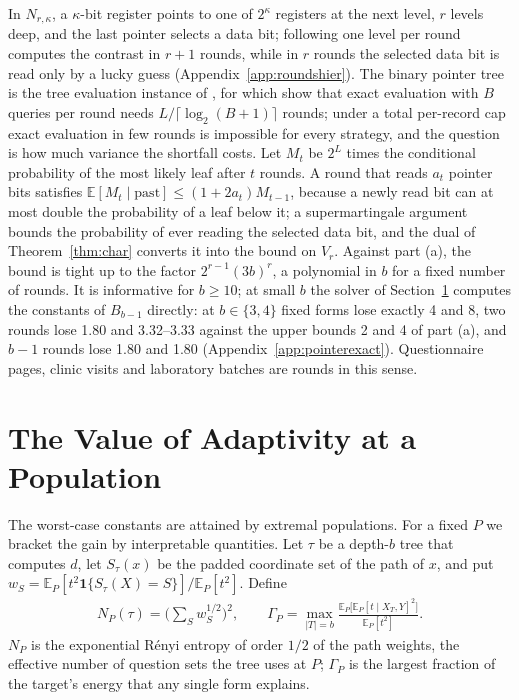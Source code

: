 \documentclass{article}
\newcommand{\E}{\mathbb{E}}
\begin{document}
In $N_{r,\kappa}$, a $\kappa$-bit register points to one of $2^\kappa$ registers at the next level, $r$ levels deep, and the last pointer selects a data bit; following one level per round computes the contrast in $r+1$ rounds, while in $r$ rounds the selected data bit is read only by a lucky guess (Appendix~\ref{app:roundshier}). The binary pointer tree is the tree evaluation instance of \citet{cook2012}, for which \citet{li2026regex} show that exact evaluation with $B$ queries per round needs $L/\lceil\log_2(B+1)\rceil$ rounds; under a total per-record cap exact evaluation in few rounds is impossible for every strategy, and the question is how much variance the shortfall costs. Let $M_t$ be $2^{L}$ times the conditional probability of the most likely leaf after $t$ rounds. A round that reads $a_t$ pointer bits satisfies $\E[M_t\mid\text{past}]\le(1+2a_t)M_{t-1}$, because a newly read bit can at most double the probability of a leaf below it; a supermartingale argument bounds the probability of ever reading the selected data bit, and the dual of Theorem~\ref{thm:char} converts it into the bound on $V_r$. Against part (a), the bound is tight up to the factor $2^{r-1}(3b)^r$, a polynomial in $b$ for a fixed number of rounds. It is informative for $b\ge10$; at small $b$ the solver of Section~\ref{sec:population} computes the constants of $B_{b-1}$ directly: at $b\in\{3,4\}$ fixed forms lose exactly 4 and 8, two rounds lose 1.80 and 3.32--3.33 against the upper bounds 2 and 4 of part (a), and $b-1$ rounds lose 1.80 and 1.80 (Appendix~\ref{app:pointerexact}). Questionnaire pages, clinic visits and laboratory batches are rounds in this sense.

\section{The Value of Adaptivity at a Population}\label{sec:population}
The worst-case constants are attained by extremal populations. For a fixed $P$ we bracket the gain by interpretable quantities. Let $\tau$ be a depth-$b$ tree that computes $d$, let $S_\tau(x)$ be the padded coordinate set of the path of $x$, and put $w_S=\E_P[t^2\mathbf 1\{S_\tau(X)=S\}]/\E_P[t^2]$. Define
\begin{gather*}
 N_P(\tau)=\Big(\sum_Sw_S^{1/2}\Big)^2,\qquad
 \Gamma_P=\max_{|T|=b}\frac{\E_P\big[\E_P[t\mid X_T,Y]^2\big]}{\E_P[t^2]}.
\end{gather*}
$N_P$ is the exponential R\'enyi entropy of order $1/2$ of the path weights, the effective number of question sets the tree uses at $P$; $\Gamma_P$ is the largest fraction of the target's energy that any single form explains.
\end{document}
